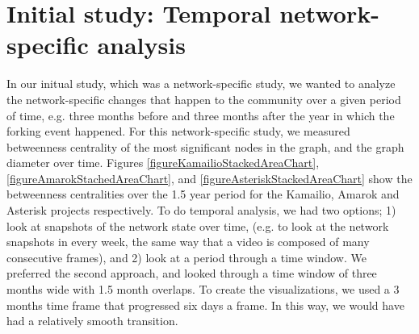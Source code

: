 \documentclass{acm_proc_article-sp}
\begin{document}

%
%

\section{Initial study: Temporal network-specific analysis}

In our initual study\cite{AzarbakhtOpenSym2013}\cite{AzarbakhtOSS2013}\cite{AzarbakhtVLHCC2014}, which was a network-specific study, we wanted to analyze the network-specific changes that happen to the community over a given period of time, e.g. three months before and three months after the year in which the forking event happened. For this network-specific study, we measured betweenness centrality \cite{Brandes} of the most significant nodes in the graph, and the graph diameter over time. Figures \ref{figureKamailioStackedAreaChart}, \ref{figureAmarokStachedAreaChart}, and \ref{figureAsteriskStackedAreaChart} show the betweenness centralities over the 1.5 year period for the Kamailio, Amarok and Asterisk projects respectively. To do temporal analysis, we had two options; 1) look at snapshots of the network state over time, (e.g. to look at the network snapshots in every week, the same way that a video is composed of many consecutive frames), and 2) look at a period through a time window. We preferred the second approach, and looked through a time window of three months wide with 1.5 month overlaps. To create the visualizations, we used a 3 months time frame that progressed six days a frame. In this way, we would have had a relatively smooth transition.
\end{document}
